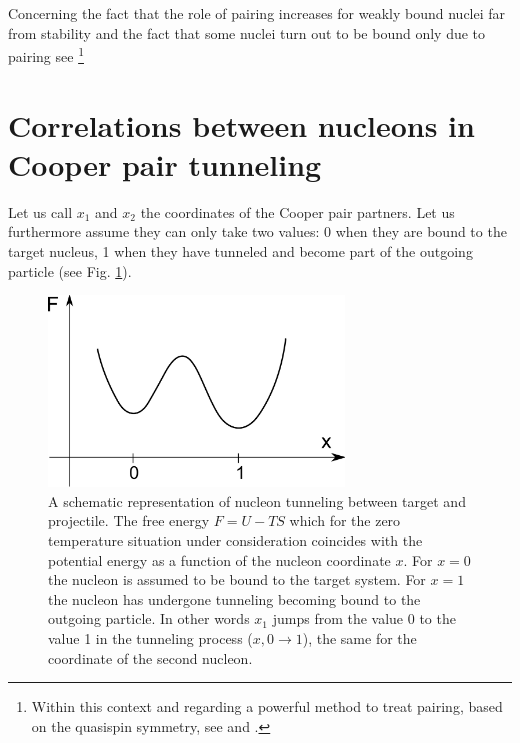 Concerning the fact that the role of pairing increases for weakly bound nuclei far from stability and the fact that some nuclei turn out to be bound only due to pairing see \cite{Zelevinsky:04}\footnote{Within this context and regarding a powerful method to treat pairing, based on the quasispin symmetry, see \cite{Volya:01} and \cite{Zelevinsky:03}.}




\section[Correlations in Cooper pair tunneling]{Correlations between nucleons in Cooper pair tunneling}\label{C3S3}
Let us call $x_1$ and $x_2$ the coordinates of the Cooper pair partners. Let us furthermore assume they can only take two values: 0 when they are bound to the target nucleus, 1 when they have tunneled and become part of the outgoing particle (see Fig. \ref{fig3.3.1}).
\begin{figure}
\centerline{\includegraphics*[width=0.7\textwidth,angle=0]{nutshell/figs/fig3_3_1.pdf}}
\caption{A schematic representation of nucleon tunneling between target and projectile. The free energy $F=U-TS$ which for the zero temperature situation under consideration coincides with the potential energy as a function of the nucleon coordinate $x$. For $x=0$ the nucleon is assumed to be bound to the target system. For $x=1$ the nucleon has undergone tunneling becoming bound to the outgoing particle. In other words $x_1$ jumps from the value 0 to the value 1 in the tunneling process ($x, 0\rightarrow 1$), the same for the coordinate of the second nucleon.}\label{fig3.3.1}
\end{figure}

